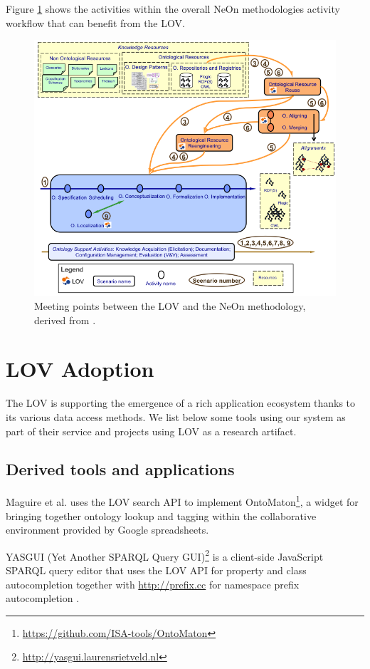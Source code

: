 \documentclass{iosart2c}
\begin{document}
Figure \ref{fig:LOVandNeOn} shows the activities within the overall NeOn methodologies activity workflow that can benefit from the LOV.
\begin{figure}[h!tp]
\centering
  \includegraphics[width=1\linewidth]{neonScenarios.png}
  \caption{Meeting points between the LOV and the NeOn methodology, derived from \cite{MC10}.}
  \label{fig:LOVandNeOn}
\end{figure}

\section{LOV Adoption}
\label{sec:lovecosystem}
The LOV is supporting the emergence of a rich application ecosystem thanks to its various data access methods. We list below some tools using our system as part of their service and projects using LOV as a research artifact.
 
\subsection{Derived tools and applications}

Maguire et al. \cite{ontomaton12} uses the LOV search API to implement OntoMaton\footnote{\url{https://github.com/ISA-tools/OntoMaton}}, a widget for bringing together ontology lookup and tagging within the collaborative environment provided by Google spreadsheets. 

YASGUI (Yet Another SPARQL Query GUI)\footnote{\url{http://yasgui.laurensrietveld.nl}} is a client-side JavaScript SPARQL query editor that uses the LOV API for property and class autocompletion together with \url{http://prefix.cc} for namespace prefix autocompletion \cite{yasgui}.
\end{document}
